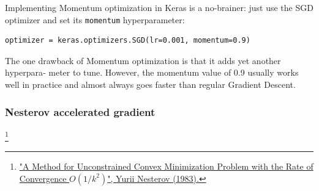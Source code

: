 \documentclass[12pt, letterpaper]{article}
\theoremstyle{definition}
\begin{document}
Implementing Momentum optimization in Keras is a no-brainer: just use the SGD optimizer and set its \lstinline+momentum+ hyperparameter:
\begin{lstlisting}
optimizer = keras.optimizers.SGD(lr=0.001, momentum=0.9)
\end{lstlisting}
The one drawback of Momentum optimization is that it adds yet another hyperpara‐ meter to tune. However, the momentum value of 0.9 usually works well in practice and almost always goes faster than regular Gradient Descent.

\subsubsection{Nesterov accelerated gradient}\footnote{\href{https://homl.info/55}{"A Method for Unconstrained Convex Minimization Problem with the Rate of Convergence $O(1/k^2)$", Yurii Nesterov (1983).}}
\end{document}
